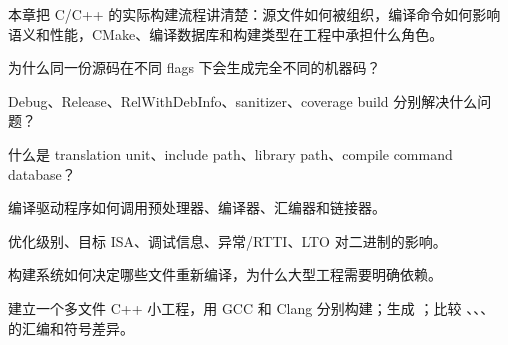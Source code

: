 {本章把 C/C++ 的实际构建流程讲清楚：源文件如何被组织，编译命令如何影响语义和性能，CMake、编译数据库和构建类型在工程中承担什么角色。}
{\item 为什么同一份源码在不同 flags 下会生成完全不同的机器码？
\item Debug、Release、RelWithDebInfo、sanitizer、coverage build 分别解决什么问题？
\item 什么是 translation unit、include path、library path、compile command database？}
{\item 编译驱动程序如何调用预处理器、编译器、汇编器和链接器。
\item 优化级别、目标 ISA、调试信息、异常/RTTI、LTO 对二进制的影响。
\item 构建系统如何决定哪些文件重新编译，为什么大型工程需要明确依赖。}
{建立一个多文件 C++ 小工程，用 GCC 和 Clang 分别构建；生成 ；比较 、、、 的汇编和符号差异。}
